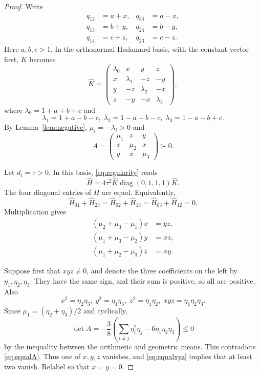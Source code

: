 \documentclass[11pt]{article}
\theoremstyle{definition}
\theoremstyle{remark}
\DeclareMathOperator{\diag}{diag}
\begin{document}
\begin{proof}
Write
\[
\begin{aligned}
q_{12}&=a+x,& q_{34}&=a-x,\\
q_{13}&=b+y,& q_{24}&=b-y,\\
q_{14}&=c+z,& q_{23}&=c-z.
\end{aligned}
\]
Here $a,b,c>1$. In the orthonormal Hadamard basis, with the constant vector first, $K$ becomes
\[
\widehat K=\begin{pmatrix}
\lambda_0&x&y&z\\
x&\lambda_1&-z&-y\\
y&-z&\lambda_2&-x\\
z&-y&-x&\lambda_3
\end{pmatrix},
\]
where $\lambda_0=1+a+b+c$ and
\[
\lambda_1=1+a-b-c,\;
\lambda_2=1-a+b-c,\;
\lambda_3=1-a-b+c.
\]
By Lemma~\ref{lem:negative}, $\mu_i=-\lambda_i>0$ and
\begin{equation}
A=\begin{pmatrix}\mu_1&z&y\\z&\mu_2&x\\y&x&\mu_3\end{pmatrix}\succ0.
\label{eq:equalA}
\end{equation}

Let $d_i=\tau>0$. In this basis, \eqref{eq:regularity} reads
\[
\widehat H=4\tau^2\widehat K\diag(0,1,1,1)\widehat K.
\]
The four diagonal entries of $H$ are equal. Equivalently,
\[
\widehat H_{01}+\widehat H_{23}
=\widehat H_{02}+\widehat H_{13}
=\widehat H_{03}+\widehat H_{12}=0.
\]
Multiplication gives
\begin{equation}
\begin{aligned}
(\mu_2+\mu_3-\mu_1)x&=yz,\\
(\mu_1+\mu_3-\mu_2)y&=xz,\\
(\mu_1+\mu_2-\mu_3)z&=xy.
\end{aligned}
\label{eq:equalxyz}
\end{equation}

Suppose first that $xyz\ne0$, and denote the three coefficients on the left by $\eta_1,\eta_2,\eta_3$. They have the same sign, and their sum is positive, so all are positive. Also
\[
x^2=\eta_2\eta_3,\; y^2=\eta_1\eta_3,\;
z^2=\eta_1\eta_2,\; xyz=\eta_1\eta_2\eta_3.
\]
Since $\mu_1=(\eta_2+\eta_3)/2$ and cyclically,
\[
\det A=-\frac38\left(\sum_{i\ne j}\eta_i^2\eta_j
-6\eta_1\eta_2\eta_3\right)\le0
\]
by the inequality between the arithmetic and geometric means. This contradicts \eqref{eq:equalA}. Thus one of $x,y,z$ vanishes, and \eqref{eq:equalxyz} implies that at least two vanish. Relabel so that $x=y=0$.


\end{proof}
\end{document}
